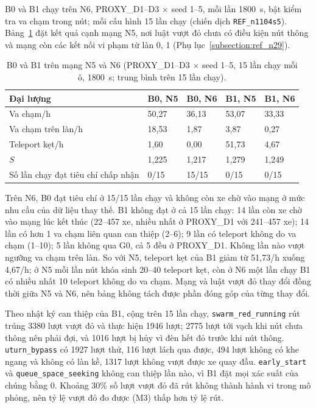 \documentclass[../main.tex]{subfiles}
\begin{document}
B0 và B1 chạy trên N6, PROXY\_D1--D3 $\times$ seed 1--5, mỗi lần 1800~s, bật kiểm tra va chạm trong nút; mỗi cấu hình 15 lần chạy (chiến dịch \texttt{REF\_n1104s5}). Bảng~\ref{table:4.ref_n1104} đặt kết quả cạnh mạng N5, nơi luật vượt đỏ chưa có điều kiện nút thông và mạng còn các kết nối vi phạm từ làn 0, 1 (Phụ lục~\ref{subsection:ref_n29}).

\begin{table}[!htbp]
\centering
\small
\caption{B0 và B1 trên mạng N5 và N6 (PROXY\_D1--D3 $\times$ seed 1--5, 15 lần chạy mỗi ô, 1800~s; trung bình trên 15 lần chạy).} \label{table:4.ref_n1104}
\begin{tabular}{|>{\raggedright\arraybackslash}p{4.6cm}|p{2.0cm}|p{2.0cm}|p{2.0cm}|p{2.0cm}|}
\hline
\textbf{Đại lượng} & \textbf{B0, N5} & \textbf{B0, N6} & \textbf{B1, N5} & \textbf{B1, N6} \\ \hline
Va chạm/h & 50,27 & 36,13 & 53,07 & 33,33 \\ \hline
Va chạm trên làn/h & 18,53 & 1,87 & 3,87 & 0,27 \\ \hline
Teleport kẹt/h & 1,60 & 0,00 & 51,73 & 4,67 \\ \hline
$S$ & 1,225 & 1,217 & 1,279 & 1,249 \\ \hline
Số lần chạy đạt tiêu chí chấp nhận & 0/15 & 15/15 & 0/15 & 0/15 \\ \hline
\end{tabular}
\end{table}

Trên N6, B0 đạt tiêu chí ở 15/15 lần chạy và không còn xe chờ vào mạng ở mức nhu cầu của dữ liệu thay thế. B1 không đạt ở cả 15 lần chạy: 14 lần còn xe chờ vào mạng lúc kết thúc (22--457 xe, nhiều nhất ở PROXY\_D1 với 241--457 xe); 14 lần có hơn 1 va chạm liên quan can thiệp (2--6); 9 lần có teleport không do va chạm (1--10); 5 lần không qua G0, cả 5 đều ở PROXY\_D1. Không lần nào vượt ngưỡng va chạm trên làn. So với N5, teleport kẹt của B1 giảm từ 51,73/h xuống 4,67/h; ở N5 mỗi lần nút khóa sinh 20--40 teleport kẹt, còn ở N6 một lần chạy B1 có nhiều nhất 10 teleport không do va chạm. Mạng và luật vượt đỏ thay đổi đồng thời giữa N5 và N6, nên bảng không tách được phần đóng góp của từng thay đổi.

Theo nhật ký can thiệp của B1, cộng trên 15 lần chạy, \texttt{swarm\_red\_running} rút trúng 3380 lượt vượt đỏ và thực hiện 1946 lượt; 2775 lượt tới vạch khi nút chưa thông nên phải đợi, và 1016 lượt bị hủy vì đèn hết đỏ trước khi nút thông. \texttt{uturn\_bypass} có 1927 lượt thử, 116 lượt lách qua được, 494 lượt không có khe ngang và không có làn kề, 1317 lượt không vượt được xe quay đầu. \texttt{early\_start} và \texttt{queue\_space\_seeking} không can thiệp lần nào, vì B1 đặt mọi xác suất của chúng bằng 0. Khoảng 30\% số lượt vượt đỏ đã rút không thành hành vi trong mô phỏng, nên tỷ lệ vượt đỏ đo được (M3) thấp hơn tỷ lệ rút.
\end{document}
